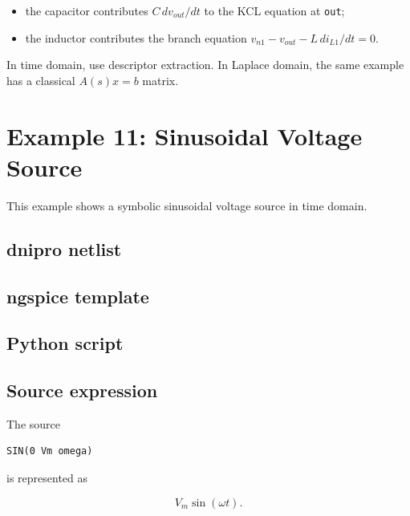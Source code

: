 \documentclass[11pt,a4paper]{article}
\newcommand{\code}[1]{\texttt{#1}}
\begin{document}
\begin{itemize}[noitemsep]
    \item the capacitor contributes \(C\,d v_{out}/dt\) to the KCL equation at
          \code{out};
    \item the inductor contributes the branch equation
          \(v_{n1}-v_{out}-L\,d i_{L1}/dt=0\).
\end{itemize}

In time domain, use descriptor extraction. In Laplace domain, the same example
has a classical \(A(s)x=b\) matrix.

\section{Example 11: Sinusoidal Voltage Source}
\label{sec:ex-sine-voltage}

This example shows a symbolic sinusoidal voltage source in time domain.

\subsection{dnipro netlist}



\subsection{ngspice template}



\subsection{Python script}



\subsection{Source expression}

The source

\begin{lstlisting}[style=spice]
SIN(0 Vm omega)
\end{lstlisting}

is represented as

\begin{equation}
    V_m\sin(\omega t).
\end{equation}
\end{document}
